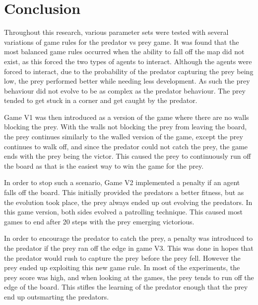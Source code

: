
\section{Conclusion}

Throughout this research, various parameter sets were tested with several variations of game rules for the predator vs prey game. It was found that the most balanced game rules occurred when the ability to fall off the map did not exist, as this forced the two types of agents to interact. Although the agents were forced to interact, due to the probability of the predator capturing the prey being low, the prey performed better while needing less development. As such the prey behaviour did not evolve to be as complex as the predator behaviour. The prey tended to get stuck in a corner and get caught by the predator. 

Game V1 was then introduced as a version of the game where there are no walls blocking the prey. With the walls not blocking the prey from leaving the board, the prey continues similarly to the walled version of the game, except the prey continues to walk off, and since the predator could not catch the prey, the game ends with the prey being the victor. This caused the prey to continuously run off the board as that is the easiest way to win the game for the prey.

In order to stop such a scenario, Game V2 implemented a penalty if an agent falls off the board. This initially provided the predators a better fitness, but as the evolution took place, the prey always ended up out evolving the predators. In this game version, both sides evolved a patrolling technique. This caused most games to end after 20 steps with the prey emerging victorious. 

In order to encourage the predator to catch the prey, a penalty was introduced to the predator if the prey ran off the edge in game V3. This was done in hopes that the predator would rush to capture the prey before the prey fell. However the prey ended up exploiting this new game rule. In most of the experiments, the prey score was high, and when looking at the games, the prey tends to run off the edge of the board. This stifles the learning of the predator enough that the prey end up outsmarting the predators.